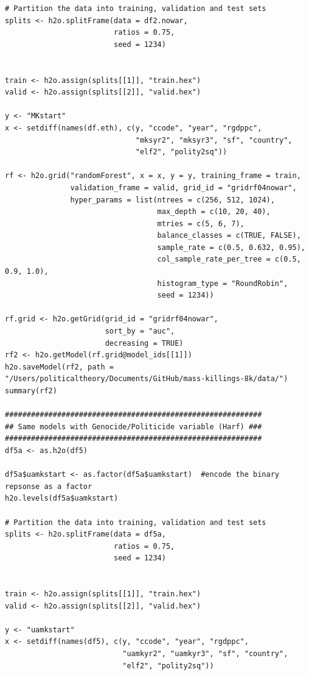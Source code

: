 \begin{verbatim}
# Partition the data into training, validation and test sets
splits <- h2o.splitFrame(data = df2.nowar, 
                         ratios = 0.75,  
                         seed = 1234)  


train <- h2o.assign(splits[[1]], "train.hex")   
valid <- h2o.assign(splits[[2]], "valid.hex") 

y <- "MKstart"
x <- setdiff(names(df.eth), c(y, "ccode", "year", "rgdppc",
                              "mksyr2", "mksyr3", "sf", "country",
                              "elf2", "polity2sq")) 

rf <- h2o.grid("randomForest", x = x, y = y, training_frame = train, 
               validation_frame = valid, grid_id = "gridrf04nowar",
               hyper_params = list(ntrees = c(256, 512, 1024),
                                   max_depth = c(10, 20, 40),
                                   mtries = c(5, 6, 7),
                                   balance_classes = c(TRUE, FALSE),
                                   sample_rate = c(0.5, 0.632, 0.95),
                                   col_sample_rate_per_tree = c(0.5, 0.9, 1.0),
                                   histogram_type = "RoundRobin",
                                   seed = 1234)) 

rf.grid <- h2o.getGrid(grid_id = "gridrf04nowar",
                       sort_by = "auc",
                       decreasing = TRUE)
rf2 <- h2o.getModel(rf.grid@model_ids[[1]])
h2o.saveModel(rf2, path = "/Users/politicaltheory/Documents/GitHub/mass-killings-8k/data/")
summary(rf2)

###########################################################
## Same models with Genocide/Politicide variable (Harf) ###
###########################################################
df5a <- as.h2o(df5)

df5a$uamkstart <- as.factor(df5a$uamkstart)  #encode the binary repsonse as a factor
h2o.levels(df5a$uamkstart)

# Partition the data into training, validation and test sets
splits <- h2o.splitFrame(data = df5a, 
                         ratios = 0.75, 
                         seed = 1234) 


train <- h2o.assign(splits[[1]], "train.hex")   
valid <- h2o.assign(splits[[2]], "valid.hex") 

y <- "uamkstart"
x <- setdiff(names(df5), c(y, "ccode", "year", "rgdppc",
                           "uamkyr2", "uamkyr3", "sf", "country",
                           "elf2", "polity2sq")) 


\end{verbatim}
